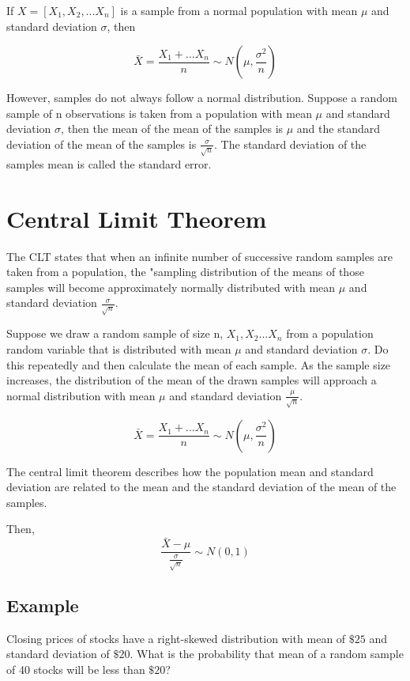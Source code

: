 \documentclass{article}
\begin{document}
    If $X=[X_{1}, X_{2}, ... X_{n}]$ is a sample from a normal population with mean $\mu$ and 
    standard deviation $\sigma$, then

    \begin{equation*}
        \bar{X} = \frac{X_{1}+...X_{n}}{n} \sim N(\mu, \frac{\sigma^{2}}{n})
    \end{equation*}

    However, samples do not always follow a normal distribution. Suppose a random sample of 
    n observations is taken from a population with mean $\mu$ and standard deviation $\sigma$,
    then the mean of the mean of the samples is $\mu$ and the standard deviation of the mean of 
    the samples is $\frac{\sigma}{\sqrt{n}}$. The standard deviation of the samples mean is called the standard error.
    
    \section*{Central Limit Theorem}
    The CLT states that when an infinite number of successive random samples are taken from a population, the "sampling 
    distribution of the means of those samples will become approximately normally distributed with mean $\mu$ and 
    standard deviation $\frac{\sigma}{\sqrt{n}}$.

    Suppose we draw a random sample of size n, $X_{1}, X_{2}...X_{n}$ from a population random variable that is distributed
    with mean $\mu$ and standard deviation $\sigma$. Do this repeatedly and then calculate the mean of each sample. As the sample size
    increases, the distribution of the mean of the drawn samples will approach a normal distribution with mean $\mu$ and standard deviation $\frac{\mu}{\sqrt{n}}$.


    \begin{equation*}
        \bar{X} = \frac{X_{1}+...X_{n}}{n} \sim N(\mu, \frac{\sigma^{2}}{n})
    \end{equation*}

    The central limit theorem describes how the population mean and standard deviation 
    are related to the mean and the standard deviation of the mean of the samples.

    Then,
    \begin{equation*}
        \frac{\bar{X}-\mu}{\frac{\sigma}{\sqrt{n}}} \sim N(0, 1)
    \end{equation*}

    \subsection*{Example}
    Closing prices of stocks have a right-skewed distribution with mean of $\$25$ and standard deviation of $\$20$.
    What is the probability that mean of a random sample of 40 stocks will be less than $\$20$?
\end{document}
